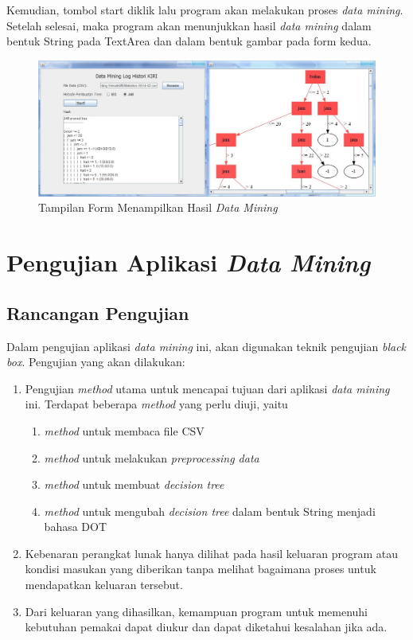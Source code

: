 Kemudian, tombol start diklik lalu program akan melakukan proses \textsl{data mining}. Setelah selesai, maka program akan menunjukkan hasil \textsl{data mining} dalam bentuk String pada TextArea dan dalam bentuk gambar pada form kedua.

\begin{figure}[H]
\centering
\includegraphics[scale=0.5]{Gambar/GUI5.jpg}
\caption[Tampilan Form Menampilkan Hasil \textsl{Data Mining}]{Tampilan Form Menampilkan Hasil \textsl{Data Mining}} 
\label{fig:GUI5}
\end{figure}

\section{Pengujian Aplikasi \textsl{Data Mining}}

\subsection{Rancangan Pengujian}

Dalam pengujian aplikasi \textsl{data mining} ini, akan digunakan teknik pengujian \textsl{black box}. Pengujian yang akan dilakukan:
\begin{enumerate}
	\item Pengujian \textsl{method} utama untuk mencapai tujuan dari aplikasi \textsl{data mining} ini. Terdapat beberapa \textsl{method} yang perlu diuji, yaitu
	\begin{enumerate}
		\item \textsl{method} untuk membaca file CSV
		\item \textsl{method} untuk melakukan \textsl{preprocessing data}
		\item \textsl{method} untuk membuat \textsl{decision tree}
		\item \textsl{method} untuk mengubah \textsl{decision tree} dalam bentuk String menjadi bahasa DOT
	\end{enumerate}
	\item Kebenaran perangkat lunak hanya dilihat pada hasil keluaran program atau kondisi masukan yang diberikan tanpa melihat bagaimana proses untuk mendapatkan keluaran tersebut.
	\item Dari keluaran yang dihasilkan, kemampuan program untuk memenuhi kebutuhan pemakai dapat diukur dan dapat diketahui kesalahan jika ada.
\end{enumerate}


